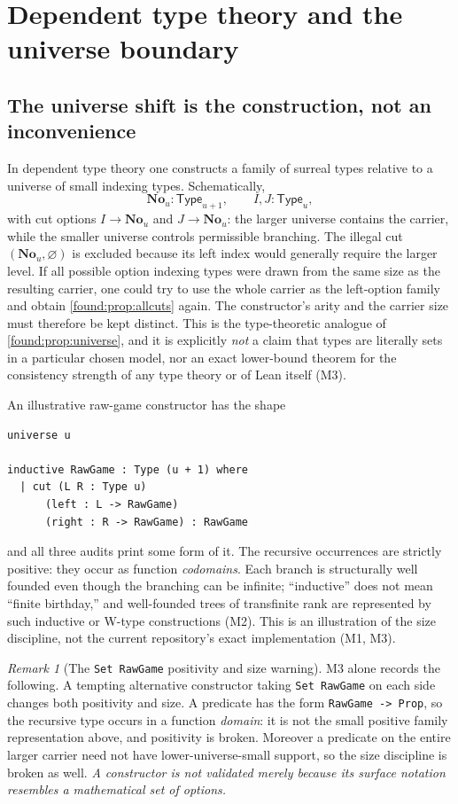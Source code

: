 \documentclass[11pt,letterpaper]{article}
\numberwithin{equation}{section}
\theoremstyle{definition}
\theoremstyle{remark}
\newtheorem{remark}[theorem]{Remark}
\newcommand{\No}{\mathbf{No}}
\newcommand{\Type}{\mathsf{Type}}
\begin{document}
\section{Dependent type theory and the universe boundary}
\label{found:sec:types}

\subsection{The universe shift is the construction, not an inconvenience}
\label{found:sub:universeshift}
In dependent type theory one constructs a family of surreal types relative to a
universe of small indexing types. Schematically,
\[
 \No_u:\Type_{u+1},\qquad I,J:\Type_u,
\]
with cut options $I\to\No_u$ and $J\to\No_u$: the larger universe contains the
carrier, while the smaller universe controls permissible branching. The illegal
cut $(\No_u,\varnothing)$ is excluded because its left index would generally
require the larger level. If all possible option indexing types were drawn from
the same size as the resulting carrier, one could try to use the whole carrier
as the left-option family and obtain \cref{found:prop:allcuts} again. The
constructor's arity and the carrier size must therefore be kept distinct. This
is the type-theoretic analogue of \cref{found:prop:universe}, and it is
explicitly \emph{not} a claim that types are literally sets in a particular
chosen model, nor an exact lower-bound theorem for the consistency strength of
any type theory or of Lean itself (M3).

An illustrative raw-game constructor has the shape
\begin{samepage}
\begin{lstlisting}
universe u

inductive RawGame : Type (u + 1) where
  | cut (L R : Type u)
      (left : L -> RawGame)
      (right : R -> RawGame) : RawGame
\end{lstlisting}
\end{samepage}
and all three audits print some form of it. The recursive occurrences are
strictly positive: they occur as function \emph{codomains}. Each branch is
structurally well founded even though the branching can be infinite;
``inductive'' does not mean ``finite birthday,'' and well-founded trees of
transfinite rank are represented by such inductive or W-type constructions (M2).
This is an illustration of the size discipline, not the current repository's
exact implementation (M1, M3).

\begin{remark}[The \texttt{Set RawGame} positivity and size warning]\label{found:rem:setrawgame}
M3 alone records the following. A tempting alternative constructor taking
\texttt{Set RawGame} on each side changes both positivity and size. A predicate
has the form \texttt{RawGame -> Prop}, so the recursive type occurs in a
function \emph{domain}: it is not the small positive family representation
above, and positivity is broken. Moreover a predicate on the entire larger
carrier need not have lower-universe-small support, so the size discipline is
broken as well. \emph{A constructor is not validated merely because its surface
notation resembles a mathematical set of options.}
\end{remark}
\end{document}
